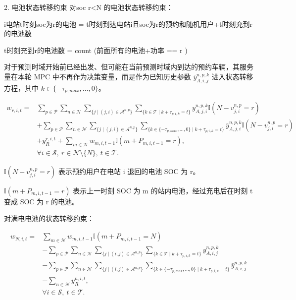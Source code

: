\documentclass[12pt,hyperref,a4paper,UTF8]{ctexart}
\begin{document}
2. 电池状态转移约束
对soc r<N 的电池状态转移约束：

i电站t时刻soc为r的电池 = t时刻到达电站i且soc为r的预约和随机用户+t时刻充到r的电池数

t时刻充到r的电池数 = count (前面所有的电池+功率 == r )


对于预测时域开始前已经出发、但可能在当前预测时域内到达的预约车辆，其服务量在本轮 MPC 中不再作为决策变量，而是作为已知历史参数 $\bar{y}_{A,i,j}^{n,p,k}$ 进入状态转移方程，其中 $k\in\{-\tau_{p,max},\ldots,0\}$。

\begin{equation}
\begin{aligned}
w_{r,i,t}
=&
\sum_{p\in \mathcal{P}}
\sum_{n\in \mathcal{N}}
\sum_{\{j\mid (j,i)\in \mathcal{A}^{n,p}\}}
\sum_{\{k\in \mathcal{T}\mid k+\tau_{p,i,k}=t\}}
y^{n,p,k}_{A,j,i}
\mathbb{I}\!\left(N-v^{n,p}_{j,i}=r\right)
\\
&+
\sum_{p\in \mathcal{P}}
\sum_{n\in \mathcal{N}}
\sum_{\{j\mid (j,i)\in \mathcal{A}^{n,p}\}}
\sum_{\{k\in \{-\tau_{p,max},\ldots,0\}\mid k+\tau_{p,i,k}=t\}}
\bar{y}^{n,p,k}_{A,j,i}
\mathbb{I}\!\left(N-v^{n,p}_{j,i}=r\right)
\\
&+
y^{r,i,t}_{R}
+
\sum_{m\in \mathcal{N}}
w_{m,i,t-1}
\mathbb{I}\!\left(m+P_{m,i,t-1}=r\right),
\\
&\forall i\in \mathcal{S},\ r\in \mathcal{N}\setminus\{N\},\ t\in \mathcal{T}.
\end{aligned}
\tag{7a}
\end{equation}

$\mathbb{I}\!\left(N-v^{n,p}_{j,i}=r\right)$
表示预约用户在电站 i 退回的电池 SOC 为 r。

$\mathbb{I}\!\left(m+P_{m,i,t-1}=r\right)$
表示上一时刻 SOC 为 m 的站内电池，经过充电后在时刻 t 变成 SOC 为 r 的电池。

对满电电池的状态转移约束：

\begin{equation}
\begin{aligned}
w_{N,i,t}
=&
\sum_{m\in \mathcal{N}}
w_{m,i,t-1}
\mathbb{I}\!\left(m+P_{m,i,t-1}=N\right)
\\
&-
\sum_{p\in \mathcal{P}}
\sum_{n\in \mathcal{N}}
\sum_{\{j\mid (i,j)\in \mathcal{A}^{n,p}\}}
\sum_{\{k\in \mathcal{T}\mid k+\tau_{p,i,k}=t\}}
y^{n,p,k}_{A,i,j}
\\
&-
\sum_{p\in \mathcal{P}}
\sum_{n\in \mathcal{N}}
\sum_{\{j\mid (i,j)\in \mathcal{A}^{n,p}\}}
\sum_{\{k\in \{-\tau_{p,max},\ldots,0\}\mid k+\tau_{p,i,k}=t\}}
\bar{y}^{n,p,k}_{A,i,j}
\\
&-
\sum_{n\in \mathcal{N}}
y^{n,i,t}_{R},
\\
&\forall i\in \mathcal{S},\ t\in \mathcal{T}.
\end{aligned}
\tag{7b}
\end{equation}
\end{document}
